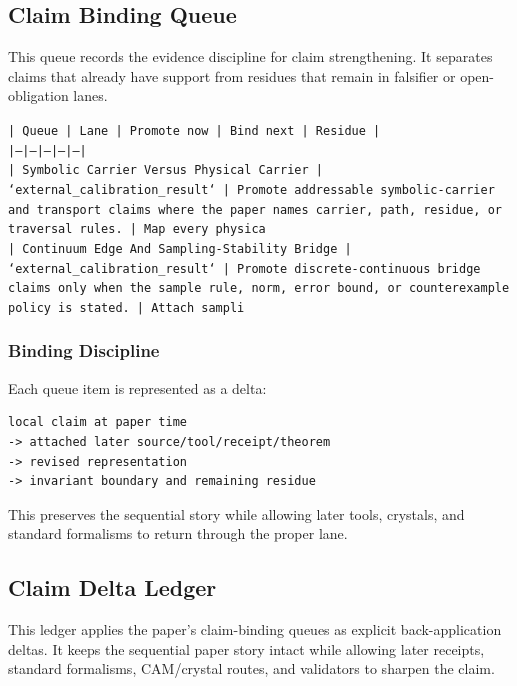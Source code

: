 \documentclass[11pt]{article}
\begin{document}
\subsection*{Claim Binding Queue}

This queue records the evidence discipline for claim strengthening. It separates claims that already have support from residues that remain in falsifier or open-obligation lanes.

\noindent\texttt{| Queue | Lane | Promote now | Bind next | Residue |}\\
\noindent\texttt{|---|---|---|---|---|}\\
\noindent\texttt{| Symbolic Carrier Versus Physical Carrier | `external\_calibration\_result` | Promote addressable symbolic-carrier and transport claims where the paper names carrier, path, residue, or traversal rules. | Map every physica}\\
\noindent\texttt{| Continuum Edge And Sampling-Stability Bridge | `external\_calibration\_result` | Promote discrete-continuous bridge claims only when the sample rule, norm, error bound, or counterexample policy is stated. | Attach sampli}\\

\subsubsection*{Binding Discipline}

Each queue item is represented as a delta:

\begin{verbatim}
local claim at paper time
-> attached later source/tool/receipt/theorem
-> revised representation
-> invariant boundary and remaining residue
\end{verbatim}

This preserves the sequential story while allowing later tools, crystals, and
standard formalisms to return through the proper lane.

\subsection*{Claim Delta Ledger}

This ledger applies the paper's claim-binding queues as explicit back-application
deltas. It keeps the sequential paper story intact while allowing later
receipts, standard formalisms, CAM/crystal routes, and validators to sharpen the
claim.
\end{document}
